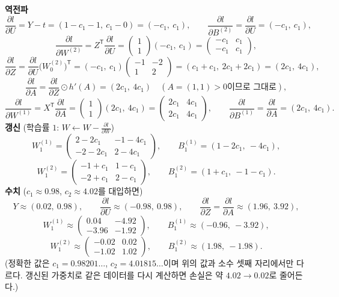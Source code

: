 \documentclass[11pt,a4paper]{article}
\newcommand{\T}{^{\mathsf T}}
\newcommand{\pd}[2]{\frac{\partial #1}{\partial #2}}
\begin{document}
\begin{problems}
\begin{solbox}
\textbf{역전파}
\[
\pd{l}{U}=Y-t=(1-c_1-1,\ c_1-0)=(-c_1,\ c_1),
\qquad
\pd{l}{B^{(2)}}=\pd{l}{U}=(-c_1,\ c_1),
\]
\[
\pd{l}{W^{(2)}}=Z\T\pd{l}{U}=\begin{pmatrix}1\\1\end{pmatrix}(-c_1,\ c_1)=\begin{pmatrix}-c_1&c_1\\-c_1&c_1\end{pmatrix},
\]
\[
\pd{l}{Z}=\pd{l}{U}\bigl(W^{(2)}_0\bigr)\T
=(-c_1,\ c_1)\begin{pmatrix}-1&-2\\1&2\end{pmatrix}
=(c_1+c_1,\ 2c_1+2c_1)=(2c_1,\ 4c_1),
\]
\[
\pd{l}{A}=\pd{l}{Z}\odot h'(A)=(2c_1,\ 4c_1)\quad(A=(1,1)>0\text{이므로 그대로}),
\]
\[
\pd{l}{W^{(1)}}=X\T\pd{l}{A}=\begin{pmatrix}1\\1\end{pmatrix}(2c_1,\ 4c_1)=\begin{pmatrix}2c_1&4c_1\\2c_1&4c_1\end{pmatrix},
\qquad
\pd{l}{B^{(1)}}=\pd{l}{A}=(2c_1,\ 4c_1).
\]
\textbf{갱신} (학습률 $1$: $W\leftarrow W-\pd{l}{W}$)
\[
W^{(1)}_1=\begin{pmatrix}2-2c_1&-1-4c_1\\-2-2c_1&2-4c_1\end{pmatrix},
\qquad
B^{(1)}_1=(1-2c_1,\ -4c_1),
\]
\[
W^{(2)}_1=\begin{pmatrix}-1+c_1&1-c_1\\-2+c_1&2-c_1\end{pmatrix},
\qquad
B^{(2)}_1=(1+c_1,\ -1-c_1).
\]
\textbf{수치} ($c_1\approx0.98$, $c_2\approx4.02$를 대입하면)
\[
Y\approx(0.02,\ 0.98),
\qquad
\pd{l}{U}\approx(-0.98,\ 0.98),
\qquad
\pd{l}{Z}=\pd{l}{A}\approx(1.96,\ 3.92),
\]
\[
W^{(1)}_1\approx\begin{pmatrix}0.04&-4.92\\-3.96&-1.92\end{pmatrix},
\qquad
B^{(1)}_1\approx(-0.96,\ -3.92),
\]
\[
W^{(2)}_1\approx\begin{pmatrix}-0.02&0.02\\-1.02&1.02\end{pmatrix},
\qquad
B^{(2)}_1\approx(1.98,\ -1.98).
\]
(정확한 값은 $c_1=0.98201\ldots$, $c_2=4.01815\ldots$이며 위의 값과 소수 셋째 자리에서만 다르다.
갱신된 가중치로 같은 데이터를 다시 계산하면 손실은 약 $4.02\to0.02$로 줄어든다.)
\end{solbox}


\end{problems}
\end{document}
